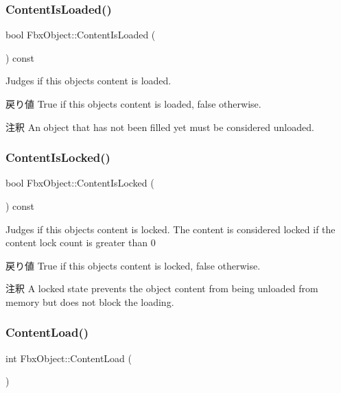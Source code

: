 \subsubsection{\texorpdfstring{Content\+Is\+Loaded()}{ContentIsLoaded()}}
{\footnotesize\ttfamily bool Fbx\+Object\+::\+Content\+Is\+Loaded (\begin{DoxyParamCaption}{ }\end{DoxyParamCaption}) const}

Judges if this object\textquotesingle{}s content is loaded. \begin{DoxyReturn}{戻り値}
{\ttfamily True} if this object\textquotesingle{}s content is loaded, {\ttfamily false} otherwise. 
\end{DoxyReturn}
\begin{DoxyRemark}{注釈}
An object that has not been filled yet must be considered unloaded. 
\end{DoxyRemark}
\mbox{\label{class_fbx_object_ad9e3373b45e2fbce5a7a11a09edd96f7}} 
\subsubsection{\texorpdfstring{Content\+Is\+Locked()}{ContentIsLocked()}}
{\footnotesize\ttfamily bool Fbx\+Object\+::\+Content\+Is\+Locked (\begin{DoxyParamCaption}{ }\end{DoxyParamCaption}) const}

Judges if this object\textquotesingle{}s content is locked. The content is considered locked if the content lock count is greater than 0 \begin{DoxyReturn}{戻り値}
{\ttfamily True} if this object\textquotesingle{}s content is locked, {\ttfamily false} otherwise. 
\end{DoxyReturn}
\begin{DoxyRemark}{注釈}
A locked state prevents the object content from being unloaded from memory but does not block the loading. 
\end{DoxyRemark}
\mbox{\label{class_fbx_object_a296d454c59bd93245dd5e2312dc7f165}} 
\subsubsection{\texorpdfstring{Content\+Load()}{ContentLoad()}}
{\footnotesize\ttfamily int Fbx\+Object\+::\+Content\+Load (\begin{DoxyParamCaption}{ }\end{DoxyParamCaption})}

